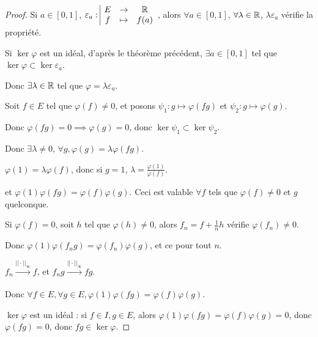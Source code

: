\begin{proof}
    Si $a \in [0, 1]$, $\varepsilon_a: \space \begin{array}{|ccc} \displaystyle E & \to & \displaystyle \mathbb{R} \\ \displaystyle f & \mapsto & \displaystyle f(a) \end{array}$, alors $\forall a \in [0, 1]$, $\forall \lambda \in \mathbb{R}$, 
    $\lambda \varepsilon_a$ vérifie la propriété.

    Si $\ker \varphi$ est un idéal, d'après le théorème précédent, $\exists a \in [0, 1]$ tel que $\ker \varphi \subset \ker \varepsilon_a$.

    Donc $\exists \lambda \in \mathbb{R}$ tel que $\varphi = \lambda \varepsilon_a$.

    \avspace Soit $f \in E$ tel que $\varphi(f) \neq 0$, et posons 
    $\psi_1: g \mapsto \varphi(fg)$ et $\psi_2: g \mapsto \varphi(g)$.

    Donc $\varphi(fg) = 0 \implies \varphi(g) = 0$, donc $\ker \psi_1 \subset \ker \psi_2$.

    Donc $\exists \lambda \neq 0$, $\forall g, \varphi(g) = \lambda \varphi(fg)$. 

    $\varphi(1) = \lambda \varphi(f)$, donc si $g = 1$, $\lambda = \frac{\varphi(1)}{\varphi(f)}$.

    et $\varphi(1) \varphi(fg) = \varphi(f) \varphi(g)$. Ceci est valable $\forall f$ tels que $\varphi(f) \neq 0$ et $g$ quelconque.

    Si $\varphi(f) = 0$, soit $h$ tel que $\varphi(h) \neq 0$, alors $f_n = f + \frac 1 n h$ vérifie $\varphi(f_n) \neq 0$.

    Donc $\varphi(1) \varphi(f_n g) = \varphi(f_n) \varphi(g)$, et ce pour tout $n$.

    $f_n  \xrightarrow[]{||\cdot||_\infty} f$, et $f_n g \xrightarrow[]{||\cdot||_\infty} fg$. 

    Donc $\forall f \in E, \forall g \in E, \varphi(1) \varphi(fg) = \varphi(f) \varphi(g)$.

    $\ker \varphi$ est un idéal : si $f \in I, g \in E$, alors $\varphi(1) \varphi(fg) = \varphi(f) \varphi(g) = 0$, donc $\varphi(fg) = 0$, donc $fg \in \ker \varphi$.


\end{proof}

